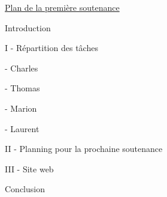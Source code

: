 \documentclass[a4paper]{article}
\begin{document}
\pagestyle{fancy}


\Large

\begin{center}

\underline{Plan de la première soutenance}

\end{center}

\quad

Introduction

\quad
\quad

I - Répartition des tâches

	- Charles
	
	- Thomas

	- Marion

	- Laurent


\quad
\quad


II  - Planning pour la prochaine soutenance

\quad
\quad

III - Site web

\quad
\quad

Conclusion 
\end{document}
